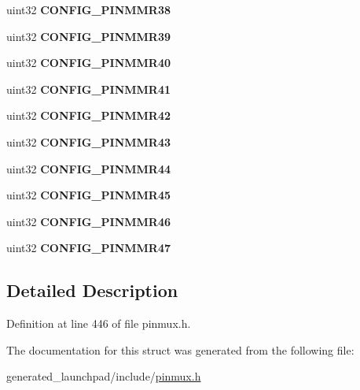 \begin{DoxyCompactItemize}
uint32 {\bfseries C\+O\+N\+F\+I\+G\+\_\+\+P\+I\+N\+M\+M\+R38}
\item 
\mbox{\label{structpinmux__config__reg_a61745429f95cd581d9f9f4eacdc2a73f}} 
uint32 {\bfseries C\+O\+N\+F\+I\+G\+\_\+\+P\+I\+N\+M\+M\+R39}
\item 
\mbox{\label{structpinmux__config__reg_a96987dadcc1c89d375ee7ccaef7ed25f}} 
uint32 {\bfseries C\+O\+N\+F\+I\+G\+\_\+\+P\+I\+N\+M\+M\+R40}
\item 
\mbox{\label{structpinmux__config__reg_ad8d941030d9ec89ded684bbd05030a63}} 
uint32 {\bfseries C\+O\+N\+F\+I\+G\+\_\+\+P\+I\+N\+M\+M\+R41}
\item 
\mbox{\label{structpinmux__config__reg_a7022ae7430cd813010b2797f72bca6bb}} 
uint32 {\bfseries C\+O\+N\+F\+I\+G\+\_\+\+P\+I\+N\+M\+M\+R42}
\item 
\mbox{\label{structpinmux__config__reg_a1955e0559bb958962e557f8188044ddc}} 
uint32 {\bfseries C\+O\+N\+F\+I\+G\+\_\+\+P\+I\+N\+M\+M\+R43}
\item 
\mbox{\label{structpinmux__config__reg_a7cc4fae4dac25eafcc3ae8390c608249}} 
uint32 {\bfseries C\+O\+N\+F\+I\+G\+\_\+\+P\+I\+N\+M\+M\+R44}
\item 
\mbox{\label{structpinmux__config__reg_a00f13af4ec31ba0dde2cb64a8279cfe4}} 
uint32 {\bfseries C\+O\+N\+F\+I\+G\+\_\+\+P\+I\+N\+M\+M\+R45}
\item 
\mbox{\label{structpinmux__config__reg_ae04a9ab7811f46a6c9bf814d524e4722}} 
uint32 {\bfseries C\+O\+N\+F\+I\+G\+\_\+\+P\+I\+N\+M\+M\+R46}
\item 
\mbox{\label{structpinmux__config__reg_a1ae94f8d2d07dd66ecbb78d2f1e5f131}} 
uint32 {\bfseries C\+O\+N\+F\+I\+G\+\_\+\+P\+I\+N\+M\+M\+R47}
\end{DoxyCompactItemize}


\subsection{Detailed Description}


Definition at line 446 of file pinmux.\+h.



The documentation for this struct was generated from the following file\+:\begin{DoxyCompactItemize}
\item 
generated\+\_\+launchpad/include/\mbox{\hyperlink{pinmux_8h}{pinmux.\+h}}\end{DoxyCompactItemize}
